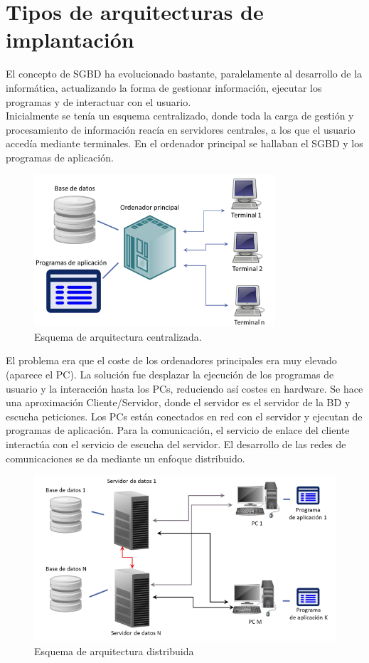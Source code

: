\documentclass[a4paper,11pt]{article}
\begin{document}
\section{Tipos de arquitecturas de implantación}
El concepto de SGBD ha evolucionado bastante, paralelamente al desarrollo de la informática, actualizando la forma de gestionar información, ejecutar los programas y de interactuar con el usuario.  \\

Inicialmente se tenía un esquema centralizado, donde toda la carga de gestión y procesamiento de información reacía en servidores centrales, a los que el usuario accedía mediante terminales. En el ordenador principal se hallaban el SGBD y los programas de aplicación. 

\begin{figure}[h]
\centering
\includegraphics[scale=1,width=0.8\textwidth]{arquitectura_centralizada.png}
\caption{Esquema de arquitectura centralizada.}
\end{figure}

El problema era que el coste de los ordenadores principales era muy elevado (aparece el PC). La solución fue desplazar la ejecución de los programas de usuario y la interacción hasta los PCs, reduciendo así costes en hardware. Se hace una aproximación Cliente/Servidor, donde el servidor es el servidor de la BD y escucha peticiones. Los PCs están conectados en red con el servidor y ejecutan de programas de aplicación. Para la comunicación, el servicio de enlace del cliente interactúa con el servicio de escucha del servidor.  El desarrollo de las redes de comunicaciones se da mediante un enfoque distribuido.

\begin{figure}
\centering
\includegraphics[scale=0.9]{arquitectura_distribuido.png}
\caption{Esquema de arquitectura distribuida}
\end{figure}
\end{document}
